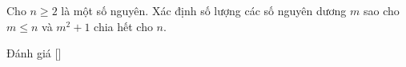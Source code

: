 \ifshowproblem
\begin{problem}\label{problem:MEMO-2015-T-P8}
    Cho \( n \ge 2 \) là một số nguyên.  
    Xác định số lượng các số nguyên dương \( m \) sao cho \( m \le n \) và \( m^2 + 1 \) chia hết cho \( n \).
\end{problem}
\fi

\ifshowinfo
Đánh giá [\textbf{}]
\fi